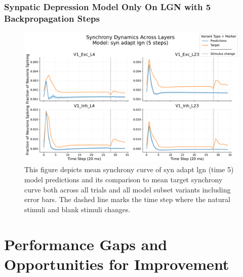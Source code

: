 \subsubsection{Synpatic Depression Model Only On LGN with 5 Backpropagation Steps}
\label{{subsubsec:syn_adap_lgn_5}}
\begin{figure}
    \centering
    \includegraphics[width=\linewidth]{img/plots/separate_model_synchrony_curve_syn_only_lgn_5_evaluation.pdf}
    \caption{This figure depicts mean synchrony curve of syn adapt lgn (time 5) model predictions and its comparison to mean target synchrony curve both across all trials and all model subset variants including error bars. The dashed line marks the time step where the natural stimuli and blank stimuli changes.}
    \label{fig:synchrony_curve_syn_adapt_lgn_5}
\end{figure}

\section{Performance Gaps and Opportunities for Improvement}
\label{sec:performace_gaps_and_opportunities_for_improvement}
